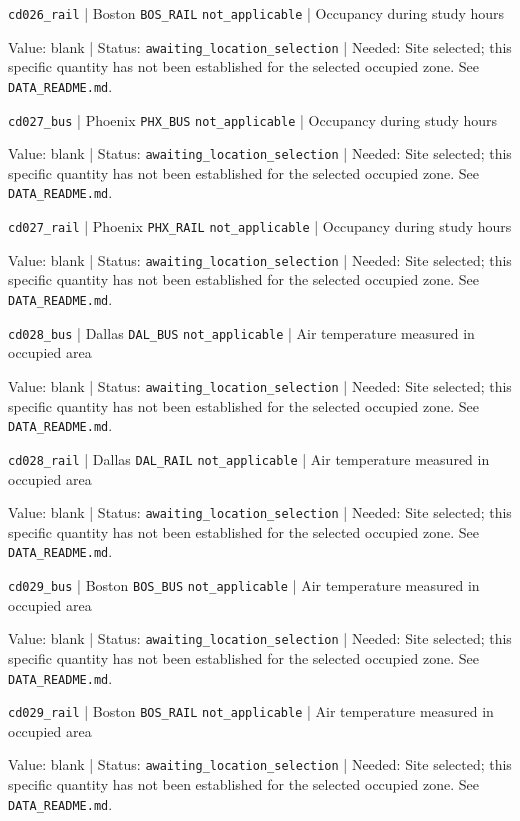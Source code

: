 \nolinkurl{cd026_rail} | Boston \nolinkurl{BOS_RAIL} \nolinkurl{not_applicable} | Occupancy during study hours

Value: blank | Status: \nolinkurl{awaiting_location_selection} | Needed: Site selected; this specific quantity has not been established for the selected occupied zone. See \nolinkurl{DATA_README.md}.

\nolinkurl{cd027_bus} | Phoenix \nolinkurl{PHX_BUS} \nolinkurl{not_applicable} | Occupancy during study hours

Value: blank | Status: \nolinkurl{awaiting_location_selection} | Needed: Site selected; this specific quantity has not been established for the selected occupied zone. See \nolinkurl{DATA_README.md}.

\nolinkurl{cd027_rail} | Phoenix \nolinkurl{PHX_RAIL} \nolinkurl{not_applicable} | Occupancy during study hours

Value: blank | Status: \nolinkurl{awaiting_location_selection} | Needed: Site selected; this specific quantity has not been established for the selected occupied zone. See \nolinkurl{DATA_README.md}.

\nolinkurl{cd028_bus} | Dallas \nolinkurl{DAL_BUS} \nolinkurl{not_applicable} | Air temperature measured in occupied area

Value: blank | Status: \nolinkurl{awaiting_location_selection} | Needed: Site selected; this specific quantity has not been established for the selected occupied zone. See \nolinkurl{DATA_README.md}.

\nolinkurl{cd028_rail} | Dallas \nolinkurl{DAL_RAIL} \nolinkurl{not_applicable} | Air temperature measured in occupied area

Value: blank | Status: \nolinkurl{awaiting_location_selection} | Needed: Site selected; this specific quantity has not been established for the selected occupied zone. See \nolinkurl{DATA_README.md}.

\nolinkurl{cd029_bus} | Boston \nolinkurl{BOS_BUS} \nolinkurl{not_applicable} | Air temperature measured in occupied area

Value: blank | Status: \nolinkurl{awaiting_location_selection} | Needed: Site selected; this specific quantity has not been established for the selected occupied zone. See \nolinkurl{DATA_README.md}.

\nolinkurl{cd029_rail} | Boston \nolinkurl{BOS_RAIL} \nolinkurl{not_applicable} | Air temperature measured in occupied area

Value: blank | Status: \nolinkurl{awaiting_location_selection} | Needed: Site selected; this specific quantity has not been established for the selected occupied zone. See \nolinkurl{DATA_README.md}.

